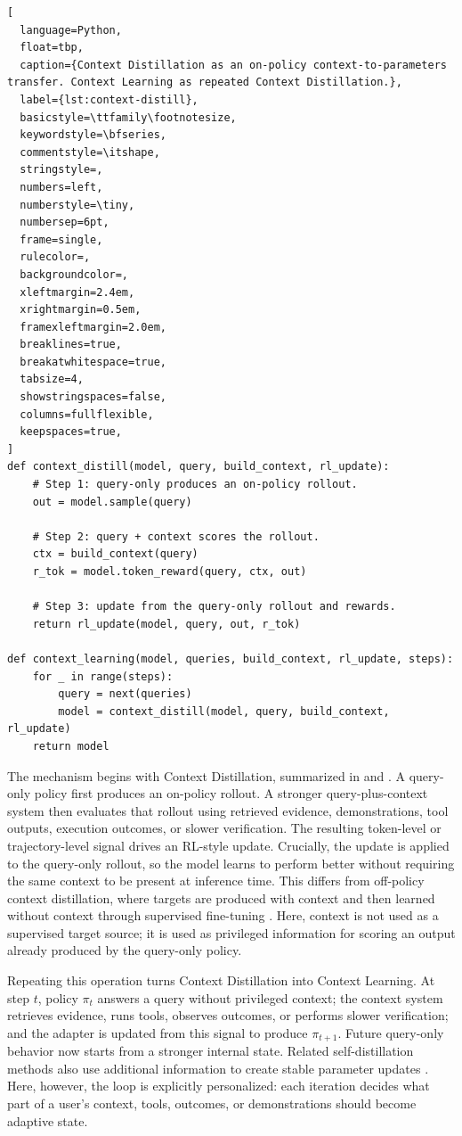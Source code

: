 \documentclass{llmxive}
\begin{document}
\begin{lstlisting}[
  language=Python,
  float=tbp,
  caption={Context Distillation as an on-policy context-to-parameters transfer. Context Learning as repeated Context Distillation.},
  label={lst:context-distill},
  basicstyle=\ttfamily\footnotesize,
  keywordstyle=\bfseries,
  commentstyle=\itshape,
  stringstyle=,
  numbers=left,
  numberstyle=\tiny,
  numbersep=6pt,
  frame=single,
  rulecolor=,
  backgroundcolor=,
  xleftmargin=2.4em,
  xrightmargin=0.5em,
  framexleftmargin=2.0em,
  breaklines=true,
  breakatwhitespace=true,
  tabsize=4,
  showstringspaces=false,
  columns=fullflexible,
  keepspaces=true,
]
def context_distill(model, query, build_context, rl_update):
    # Step 1: query-only produces an on-policy rollout.
    out = model.sample(query)

    # Step 2: query + context scores the rollout.
    ctx = build_context(query)
    r_tok = model.token_reward(query, ctx, out)

    # Step 3: update from the query-only rollout and rewards.
    return rl_update(model, query, out, r_tok)

def context_learning(model, queries, build_context, rl_update, steps):
    for _ in range(steps):
        query = next(queries)
        model = context_distill(model, query, build_context, rl_update)
    return model
\end{lstlisting}

The mechanism begins with Context Distillation, summarized in  and . A query-only policy first produces an on-policy rollout. A stronger query-plus-context system then evaluates that rollout using retrieved evidence, demonstrations, tool outputs, execution outcomes, or slower verification. The resulting token-level or trajectory-level signal drives an RL-style update. Crucially, the update is applied to the query-only rollout, so the model learns to perform better without requiring the same context to be present at inference time. This differs from off-policy context distillation, where targets are produced with context and then learned without context through supervised fine-tuning \citep{snell2022distillingcontext}. Here, context is not used as a supervised target source; it is used as privileged information for scoring an output already produced by the query-only policy.

Repeating this operation turns Context Distillation into Context Learning. At step \(t\), policy \(\pi_t\) answers a query without privileged context; the context system retrieves evidence, runs tools, observes outcomes, or performs slower verification; and the adapter is updated from this signal to produce \(\pi_{t+1}\). Future query-only behavior now starts from a stronger internal state. Related self-distillation methods also use additional information to create stable parameter updates \citep{hubotter2026selfdistillation,shenfeld2026continualselfdistillation}. Here, however, the loop is explicitly personalized: each iteration decides what part of a user's context, tools, outcomes, or demonstrations should become adaptive state.
\end{document}
